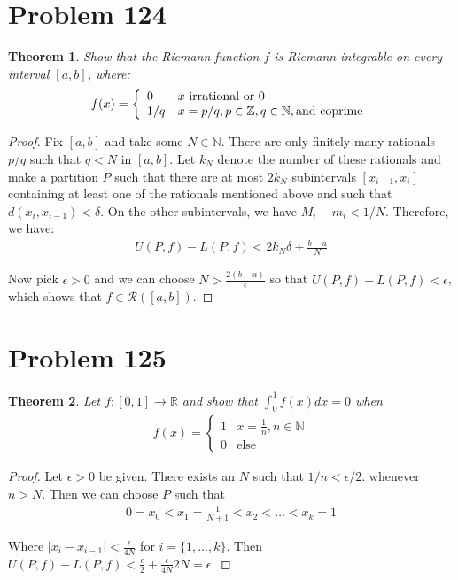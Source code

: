 \documentclass[psamsfonts]{amsart}
\newtheorem{thm}{Theorem}[section]
\theoremstyle{definition}
\theoremstyle{remark}
\numberwithin{equation}{section}
\begin{document}
\section{Problem 124}

\begin{thm}
Show that the Riemann function $f$ is Riemann integrable on every interval $[a,b]$, where:
\begin{eqnarray}
f(x) = \left\{ \begin{array}{ l l}
0 & x \mbox{ irrational or 0} \\
1/q & x = p/q, p \in \mathbb{Z}, q \in \mathbb{N}, \mbox{and coprime} 
\end{array} \right.
\end{eqnarray}
\end{thm}

\begin{proof}
Fix $[a,b]$ and take some $N \in \mathbb{N}$. There are only finitely many rationals $p/q$ such that $q < N$ in $[a,b]$. Let $k_N$ denote the number of these rationals and make a partition $P$ such that there are at most $2k_N$ subintervals $[x_{i-1},x_i]$ containing at least one of the rationals mentioned above and such that $d(x_i,x_{i-1}) < \delta$. On the other subintervals, we have $M_i - m_i < 1/N$. Therefore, we have:
\begin{eqnarray}
U(P,f) - L(P,f) < 2 k_N \delta + \frac{b-a}{N}
\end{eqnarray}

Now pick $\epsilon > 0$ and we can choose $N > \frac{2 (b-a)}{\epsilon}$ so that $U(P,f) - L(P,f) < \epsilon$, which shows that $f \in \mathscr{R}([a,b])$. 
\end{proof}

\section{Problem 125}

\begin{thm}
Let $f: [0,1] \to \mathbb{R}$ and show that $\int_0^1 f(x) dx = 0$ when
\begin{eqnarray}
f(x) = \left\{ \begin{array}{ll}
1 & x = \frac{1}{n}, n \in \mathbb{N} \\
0 & \mathrm{else}
\end{array} \right.
\end{eqnarray}
\end{thm}

\begin{proof}
Let $\epsilon > 0$ be given. There exists an $N$ such that $1/n < \epsilon / 2$. whenever $n > N$. Then we can choose $P$ such that 
\begin{eqnarray}
0 = x_0 < x_1 = \frac{1}{N + 1} < x_2 < \ldots < x_k = 1
\end{eqnarray}

Where $|x_i - x_{i-1} | < \frac{\epsilon}{4N}$ for $i = \{1, \ldots, k \}$. Then $U(P,f) - L(P,f) < \frac{\epsilon}{2} + \frac{\epsilon}{4N} 2N = \epsilon$. 
\end{proof}
\end{document}
